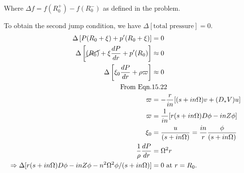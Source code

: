 Where $\Delta f = f(R_{0}^{+}) - f({R_{0}^{-}})$ as defined in the problem.

To obtain the second jump condition, we have $\Delta [\textrm{total pressure}] = 0$.
\begin{align}
 \begin{split}
 \Delta \left[ P(R_{0}+\xi) + p'(R_{0}+\xi) \right] &= 0\\
 \Delta \left[\cancel{(R_{0})} + \xi \frac{dP}{dr} + p'(R_{0}) \right] & \approx 0\\
 \Delta \left[\xi_{0} \frac{dP}{dr} + \rho \varpi \right] & \approx 0\\
 \textrm{From Eqn.} & 15.22\\
 \varpi &= - \frac{r}{in}[(s + in\Omega)v + (D_{*}V)u]\\
 \varpi &= \frac{1}{in}[r(s + in\Omega)D\phi - inZ\phi]\\
 \xi_{0} &=\frac{u}{(s+in\Omega)} = \frac{in}{r}\frac{\phi}{(s+in\Omega)}\\
 \frac{1}{\rho}\frac{dP}{dr} & = \Omega^{2}r\\
 \Rightarrow \Delta[r(s + in\Omega)D\phi - inZ\phi - n^{2}\Omega^{2}\phi/(s+in\Omega)] & = 0 \textrm{ at } r = R_{0}. 
\end{split}
\end{align}
